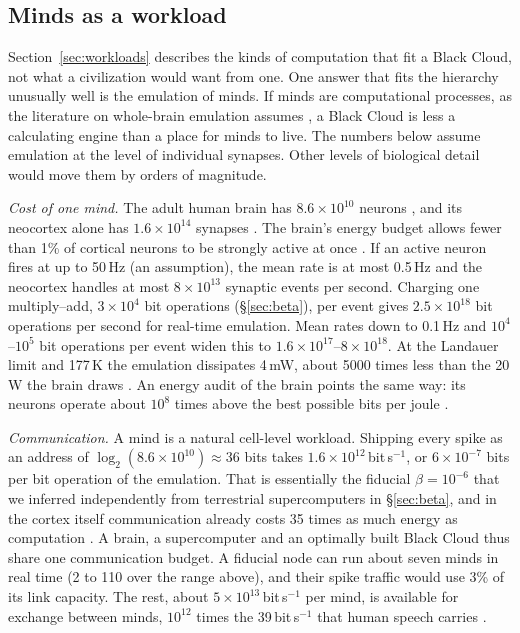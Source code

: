 \documentclass[final,5p]{elsarticle}
\begin{document}
\subsection{Minds as a workload}\label{sec:minds}
Section~\ref{sec:workloads} describes the kinds of computation that fit a Black Cloud, not what a civilization would want from one. One answer that fits the hierarchy unusually well is the emulation of minds. If minds are computational processes, as the literature on whole-brain emulation assumes \citep{Eth2013,Hanson2016}, a Black Cloud is less a calculating engine than a place for minds to live. The numbers below assume emulation at the level of individual synapses. Other levels of biological detail would move them by orders of magnitude.

\emph{Cost of one mind.} The adult human brain has $8.6\times10^{10}$ neurons \citep{Azevedo2009}, and its neocortex alone has $1.6\times10^{14}$ synapses \citep{Tang2001}. The brain's energy budget allows fewer than 1\% of cortical neurons to be strongly active at once \citep{Lennie2003}. If an active neuron fires at up to 50\,Hz (an assumption), the mean rate is at most 0.5\,Hz and the neocortex handles at most $8\times10^{13}$ synaptic events per second. Charging one multiply--add, $3\times10^4$ bit operations (\S\ref{sec:beta}), per event gives $2.5\times10^{18}$ bit operations per second for real-time emulation. Mean rates down to 0.1\,Hz and $10^4$--$10^5$ bit operations per event widen this to $1.6\times10^{17}$--$8\times10^{18}$. At the Landauer limit and 177\,K the emulation dissipates 4\,mW, about 5000 times less than the 20\,W the brain draws \citep{Levy2020}. An energy audit of the brain points the same way: its neurons operate about $10^8$ times above the best possible bits per joule \citep{Levy2021}.

\emph{Communication.} A mind is a natural cell-level workload. Shipping every spike as an address of $\log_2(8.6\times10^{10})\approx36$ bits takes $1.6\times10^{12}$\,bit\,s$^{-1}$, or $6\times10^{-7}$ bits per bit operation of the emulation. That is essentially the fiducial $\beta=10^{-6}$ that we inferred independently from terrestrial supercomputers in \S\ref{sec:beta}, and in the cortex itself communication already costs 35 times as much energy as computation \citep{Levy2021}. A brain, a supercomputer and an optimally built Black Cloud thus share one communication budget. A fiducial node can run about seven minds in real time (2 to 110 over the range above), and their spike traffic would use 3\% of its link capacity. The rest, about $5\times10^{13}$\,bit\,s$^{-1}$ per mind, is available for exchange between minds, $10^{12}$ times the 39\,bit\,s$^{-1}$ that human speech carries \citep{Coupe2019}.
\end{document}
